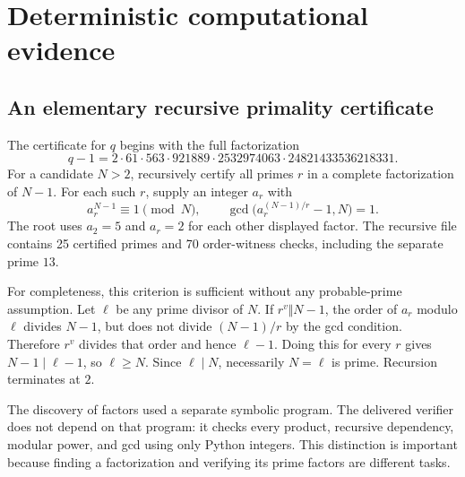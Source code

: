 \documentclass[11pt]{article}
\theoremstyle{definition}\newtheorem{definition}[theorem]{Definition}
\theoremstyle{remark}\newtheorem{remark}[theorem]{Remark}
\begin{document}
\section{Deterministic computational evidence}\label{sec:prime}
\subsection{An elementary recursive primality certificate}
The certificate for \(q\) begins with the full factorization
\[
 q-1=2\cdot61\cdot563\cdot921889\cdot2532974063
              \cdot24821433536218331.
\]
For a candidate \(N>2\), recursively certify all primes \(r\) in a complete factorization of \(N-1\). For each such \(r\), supply an integer \(a_r\) with
\begin{equation}\label{eq:lucas}
 a_r^{N-1}\equiv1\pmod N,\qquad
 \gcd\bigl(a_r^{(N-1)/r}-1,N\bigr)=1.
\end{equation}
The root uses \(a_2=5\) and \(a_r=2\) for each other displayed factor. The recursive file contains 25 certified primes and 70 order-witness checks, including the separate prime \(13\).

For completeness, this criterion is sufficient without any probable-prime assumption. Let \(\ell\) be any prime divisor of \(N\). If \(r^v\Vert N-1\), the order of \(a_r\) modulo \(\ell\) divides \(N-1\), but does not divide \((N-1)/r\) by the gcd condition. Therefore \(r^v\) divides that order and hence \(\ell-1\). Doing this for every \(r\) gives \(N-1\mid\ell-1\), so \(\ell\ge N\). Since \(\ell\mid N\), necessarily \(N=\ell\) is prime. Recursion terminates at \(2\).

The discovery of factors used a separate symbolic program. The delivered verifier does not depend on that program: it checks every product, recursive dependency, modular power, and gcd using only Python integers. This distinction is important because finding a factorization and verifying its prime factors are different tasks.
\end{document}
